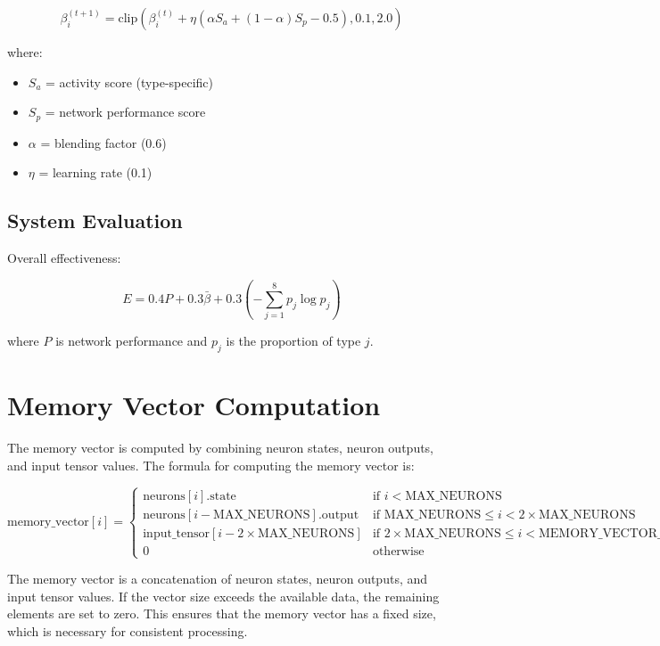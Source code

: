\documentclass{article}
\begin{document}
\begin{equation}
\beta_i^{(t+1)} = \text{clip}\left(\beta_i^{(t)} + \eta(\alpha S_a + (1-\alpha)S_p - 0.5), 0.1, 2.0\right)
\end{equation}

where:
\begin{itemize}[leftmargin=*]
\item $S_a$ = activity score (type-specific)
\item $S_p$ = network performance score
\item $\alpha$ = blending factor (0.6)
\item $\eta$ = learning rate (0.1)
\end{itemize}

\subsection{System Evaluation}
Overall effectiveness:

\begin{equation}
E = 0.4P + 0.3\bar{\beta} + 0.3\left(-\sum_{j=1}^8 p_j \log p_j\right)
\end{equation}

where $P$ is network performance and $p_j$ is the proportion of type $j$.

\section{Memory Vector Computation}
The memory vector is computed by combining neuron states, neuron outputs, and input tensor values. The formula for computing the memory vector is:

\[
\text{memory\_vector}[i] =
\begin{cases}
\text{neurons}[i].\text{state} & \text{if } i < \text{MAX\_NEURONS} \\
\text{neurons}[i - \text{MAX\_NEURONS}].\text{output} & \text{if } \text{MAX\_NEURONS} \leq i < 2 \times \text{MAX\_NEURONS} \\
\text{input\_tensor}[i - 2 \times \text{MAX\_NEURONS}] & \text{if } 2 \times \text{MAX\_NEURONS} \leq i < \text{MEMORY\_VECTOR\_SIZE} \\
0 & \text{otherwise}
\end{cases}
\]

The memory vector is a concatenation of neuron states, neuron outputs, and input tensor values. If the vector size exceeds the available data, the remaining elements are set to zero. This ensures that the memory vector has a fixed size, which is necessary for consistent processing.
\end{document}

